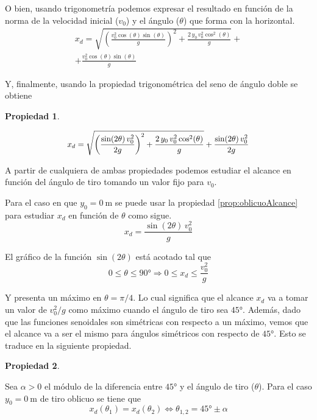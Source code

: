 \documentclass[a5paper,12pt,twoside]{book}
\newtheorem{prop}{{Propiedad}}[chapter]
\begin{document}
O bien, usando trigonometría podemos expresar el resultado en función de la norma de la velocidad inicial ($v_0$) y el ángulo ($\theta$) que forma con la horizontal.
\begin{multline*}
    x_d = \sqrt{\left(\frac{v_0^2 \cos(\theta) \sin(\theta)}{g}\right)^2 + \frac{2 \, y_0 \, v_0^2 \cos^2(\theta)}{g}} +
    \\ + \frac{v_0^2 \cos(\theta) \sin(\theta)}{g}
\end{multline*}

Y, finalmente, usando la propiedad trigonométrica del seno de ángulo doble se obtiene

\begin{mdframed}[style=MyFrame1]
    \begin{prop}
    \end{prop}
    \begin{equation*}
        \scale{0.94}{
        x_d = \sqrt{\left(\frac{\sin(2\theta) \, v_0^2}{2g}\right)^2 + \frac{2 \, y_0 \, v_0^2 \cos^2(\theta)}{g}} + \frac{\sin(2\theta) \, v_0^2}{2g}
        }
    \end{equation*}
\end{mdframed}

A partir de cualquiera de ambas propiedades podemos estudiar el alcance en función del ángulo de tiro tomando un valor fijo para $v_0$.

Para el caso en que $y_0 = \SI{0}{\metre}$ se puede usar la propiedad \ref{prop:oblicuoAlcance} para estudiar $x_d$ en función de $\theta$ como sigue.
\begin{equation*}
    x_d = \frac{\sin(2\theta) \, v_0^2}{g}
\end{equation*}

El gráfico de la función $\sin(2\theta)$ está acotado tal que
\begin{equation*}
    0 \leq \theta \leq \ang{90} \Rightarrow 0 \leq x_d \leq \frac{v_0^2}{g}
\end{equation*}

Y presenta un máximo en $\theta=\pi/4$.
Lo cual significa que el alcance $x_d$ va a tomar un valor de $v_0^2/g$ como máximo cuando el ángulo de tiro sea $\ang{45}$.
Además, dado que las funciones senoidales son simétricas con respecto a un máximo, vemos que el alcance va a ser el mismo para ángulos simétricos con respecto de $\ang{45}$.
Esto se traduce en la siguiente propiedad.

\begin{mdframed}[style=MyFrame1]
    \begin{prop}
    \end{prop}
    Sea $\alpha>0$ el módulo de la diferencia entre $\ang{45}$ y el ángulo de tiro ($\theta$).
    Para el caso $y_0 = \SI{0}{\metre}$ de tiro oblicuo se tiene que
    \begin{equation*}
        x_d(\theta_1) = x_d(\theta_2) \iff \theta_{1,2} = \ang{45} \pm \alpha
    \end{equation*}
\end{mdframed}
\end{document}
